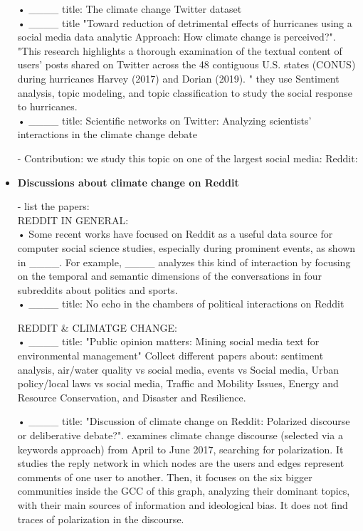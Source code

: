 \begin{itemize}
• ____ title: The climate change Twitter dataset\\

• ____ title "Toward reduction of detrimental effects of hurricanes using a social media data analytic Approach: How climate change is perceived?". "This research highlights a thorough examination of the textual content of users’ posts shared on Twitter across the 48 contiguous U.S. states (CONUS) during hurricanes Harvey (2017) and Dorian (2019). " they use Sentiment analysis, topic modeling, and topic classification to study the social response to hurricanes. \\

• ____ title: Scientific networks on Twitter: Analyzing scientists’ interactions in the climate change debate


- Contribution: we study this topic on one of the largest social media: Reddit:

\item \textbf{Discussions about climate change on Reddit}

- list the papers:\\
REDDIT IN GENERAL:\\
• Some recent works have focused on Reddit as a useful data source for computer social science studies, especially during prominent events, as shown in ____. For example, ____ analyzes this kind of interaction by focusing on the temporal and semantic dimensions of the conversations in four subreddits about politics and sports.\\ 


• ____ title: No echo in the chambers of political interactions on Reddit

REDDIT \& CLIMATGE CHANGE:\\
• ____ title: "Public opinion matters: Mining social media text for environmental management" Collect different papers about:
sentiment analysis, air/water quality vs social media, events vs Social media, Urban policy/local laws vs social media, Traffic and Mobility Issues, Energy and Resource Conservation, and Disaster and Resilience.  


• ____ title: "Discussion of climate change on Reddit: Polarized discourse or deliberative debate?". examines climate change discourse (selected via a keywords approach) from April to June 2017, searching for polarization. It studies the reply network in which nodes are the users and edges represent comments of one user to another. Then, it focuses on the six bigger communities inside the GCC of this graph, analyzing their dominant topics, with their main sources of information and ideological bias. It does not find traces of polarization in the discourse. \\


\end{itemize}
